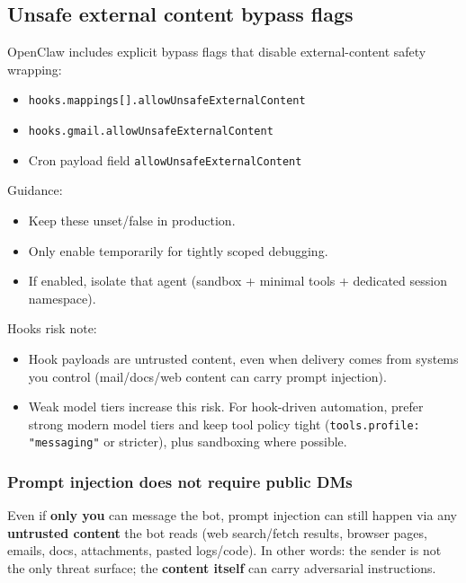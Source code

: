 \subsection{Unsafe external content bypass flags}


OpenClaw includes explicit bypass flags that disable external-content safety wrapping:

\begin{itemize}
  \item \texttt{hooks.mappings[].allowUnsafeExternalContent}
  \item \texttt{hooks.gmail.allowUnsafeExternalContent}
  \item Cron payload field \texttt{allowUnsafeExternalContent}
\end{itemize}


Guidance:

\begin{itemize}
  \item Keep these unset/false in production.
  \item Only enable temporarily for tightly scoped debugging.
  \item If enabled, isolate that agent (sandbox + minimal tools + dedicated session namespace).
\end{itemize}


Hooks risk note:

\begin{itemize}
  \item Hook payloads are untrusted content, even when delivery comes from systems you control (mail/docs/web content can carry prompt injection).
  \item Weak model tiers increase this risk. For hook-driven automation, prefer strong modern model tiers and keep tool policy tight (\texttt{tools.profile: "messaging"} or stricter), plus sandboxing where possible.
\end{itemize}


\subsubsection{Prompt injection does not require public DMs}


Even if \textbf{only you} can message the bot, prompt injection can still happen via
any \textbf{untrusted content} the bot reads (web search/fetch results, browser pages,
emails, docs, attachments, pasted logs/code). In other words: the sender is not
the only threat surface; the \textbf{content itself} can carry adversarial instructions.

